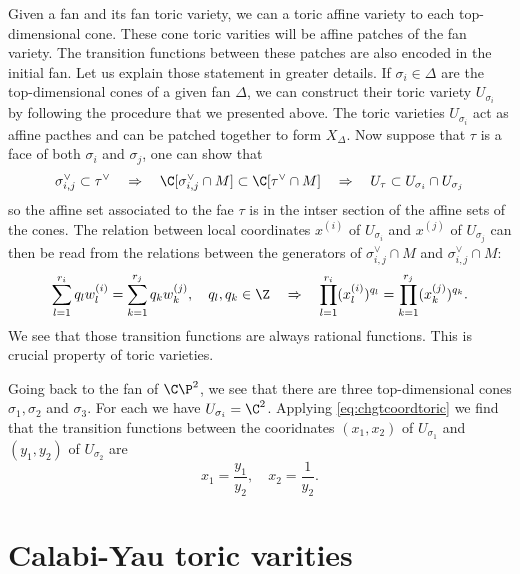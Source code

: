 \documentclass{worksheetclass}
\begin{document}
    Given a fan and its fan toric variety, we can a toric affine variety to each top-dimensional cone. These cone toric varities will be affine patches of the fan variety. The transition functions between these patches are also encoded in the initial fan. Let us explain those statement in greater details. If $\sigma_i\in\Delta$ are the top-dimensional cones of a given fan $\Delta$, we can construct their toric variety $U_{\sigma_i}$ by following the procedure that we presented above. The toric varieties $U_{\sigma_i}$ act as affine pacthes and can be patched together to form $X_\Delta$. Now suppose that $\tau$ is a face of both $\sigma_i$ and $\sigma_j$, one can show that
    \begin{equation}
        \sigma^\vee_{i,j}\subset\tau^\vee\quad\Rightarrow\quad \C[\sigma^\vee_{i,j}\cap M]\subset\C[\tau^\vee\cap M]\quad\Rightarrow\quad U_\tau\subset U_{\sigma_i}\cap U_{\sigma_j}
    \end{equation}
    so the affine set associated to the fae $\tau$ is in the intser section of the affine sets of the cones. The relation between local coordinates $x^(i)$ of $U_{\sigma_i}$ and $x^(j)$ of $U_{\sigma_j}$ can then be read from the relations between the generators of $\sigma^\vee_{i,j}\cap M$ and $\sigma^\vee_{i,j}\cap M$:
    \begin{equation}
        \sum^{r_i}_{l=1}q_lw^{(i)}_l = \sum^{r_j}_{k=1}q_kw^{(j)}_k,\quad q_l,q_k\in\Z\quad\Rightarrow\quad \prod^{r_i}_{l=1}(x^{(i)}_l)^{q_l} = \prod^{r_j}_{k=1}(x^{(j)}_k)^{q_k}.\label{eq:chgtcoordtoric}
    \end{equation}
    We see that those transition functions are always rational functions. This is crucial property of toric varieties.

    \begin{examp*}
        Going back to the fan of $\C\P^2$, we see that there are three top-dimensional cones $\sigma_1,\sigma_2$ and $\sigma_3$. For each we have $U_{\sigma_i}=\C^2$. Applying \eqref{eq:chgtcoordtoric} we find that the transition functions between the cooridnates $(x_1,x_2)$ of $U_{\sigma_1}$ and $(y_1,y_2)$ of $U_{\sigma_2}$ are
        \begin{equation}
            x_1=\frac{y_1}{y_2},\quad x_2=\frac{1}{y_2}.
        \end{equation}
    \end{examp*}

\section{Calabi-Yau toric varities}
\end{document}

